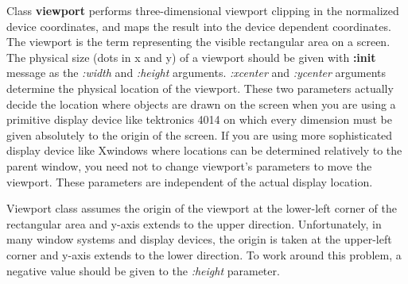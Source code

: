 Class {\bf viewport} performs three-dimensional viewport clipping in
the normalized device coordinates, and maps the result into the device
dependent coordinates.
The viewport is the term representing the visible rectangular area
on a screen.
The physical size (dots in x and y) of a viewport should be given with 
{\bf :init} message as the {\em :width} and {\em :height} arguments.
{\em :xcenter} and {\em :ycenter} arguments determine
the physical location of the viewport.
These two parameters actually decide the location where objects are drawn
on the screen when you are using a primitive display device like tektronics
4014 on which every dimension must be given absolutely to the origin of the
screen.
If you are using more sophisticated display device like Xwindows where
locations can be determined relatively to the parent window, you need not
to change viewport's parameters to move the viewport.
These parameters are independent of the actual display location.

Viewport class assumes the origin of the viewport at the lower-left corner of
the rectangular area and y-axis extends to the upper direction.
Unfortunately, in many window systems and display devices, the origin is taken
at the upper-left corner and y-axis extends to the lower direction.
To work around this problem, a negative value should be given to the
{\em :height} parameter.

